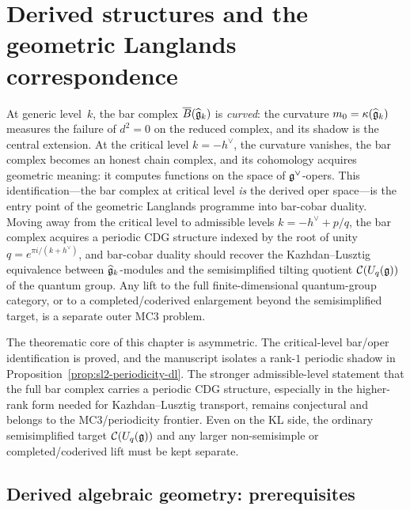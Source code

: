 \chapter{Derived structures and the geometric Langlands correspondence}
\label{ch:derived-langlands}


At generic level~$k$, the bar complex $\overline{B}(\widehat{\mathfrak{g}}_k)$ is
\emph{curved}: the curvature $m_0 = \kappa(\widehat{\mathfrak{g}}_k)$
measures the failure of $d^2 = 0$ on the reduced complex, and its
shadow is the central extension.  At the critical level
$k = -h^\vee$, the curvature vanishes, the bar complex becomes
an honest chain complex, and its cohomology acquires geometric
meaning: it computes functions on the space of
$\mathfrak{g}^\vee$-opers.  This identification---the bar complex at
critical level \emph{is} the derived oper space---is the entry
point of the geometric Langlands programme into bar-cobar duality.
Moving away from the critical level to admissible levels
$k = -h^\vee + p/q$, the bar complex acquires a periodic CDG
structure indexed by the root of unity
$q = e^{\pi i/(k + h^\vee)}$, and bar-cobar duality should
recover the Kazhdan--Lusztig equivalence between
$\widehat{\mathfrak{g}}_k$-modules and the semisimplified tilting
quotient $\mathcal{C}(U_q(\mathfrak{g}))$ of the quantum group.  Any lift
to the full finite-dimensional quantum-group category, or to a
completed/coderived enlargement beyond the semisimplified target, is
a separate outer MC3 problem.

\begin{remark}
The theorematic core of this chapter is asymmetric.  The critical-level
bar/oper identification is proved, and the manuscript isolates a
rank-$1$ periodic shadow in
Proposition~\ref{prop:sl2-periodicity-dl}.  The stronger admissible-level
statement that the full bar complex carries a periodic CDG structure,
especially in the higher-rank form needed for Kazhdan--Lusztig
transport, remains conjectural and belongs to the MC3/periodicity
frontier.  Even on the KL side, the ordinary semisimplified target
$\mathcal{C}(U_q(\mathfrak{g}))$ and any larger non-semisimple or
completed/coderived lift must be kept separate.
\end{remark}


\section{Derived algebraic geometry: prerequisites}
\label{sec:dag-prerequisites}

